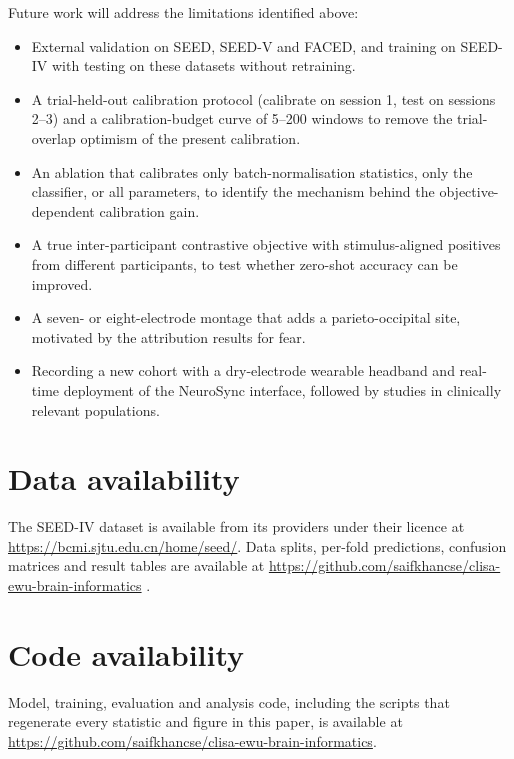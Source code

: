 Future work will address the limitations identified above:

\begin{itemize}
  \item External validation on SEED, SEED-V and FACED, and training on SEED-IV with testing on these datasets without retraining\cite{seed,seedv,faced}.
  \item A trial-held-out calibration protocol (calibrate on session 1, test on sessions 2–3) and a calibration-budget curve of 5–200 windows to remove the trial-overlap optimism of the present calibration.
  \item An ablation that calibrates only batch-normalisation statistics, only the classifier, or all parameters, to identify the mechanism behind the objective-dependent calibration gain.
  \item A true inter-participant contrastive objective with stimulus-aligned positives from different participants, to test whether zero-shot accuracy can be improved.
  \item A seven- or eight-electrode montage that adds a parieto-occipital site, motivated by the attribution results for fear.
  \item Recording a new cohort with a dry-electrode wearable headband and real-time deployment of the NeuroSync interface, followed by studies in clinically relevant populations.
\end{itemize}


\section*{Data availability}
The SEED-IV dataset is available from its providers under their licence at \url{https://bcmi.sjtu.edu.cn/home/seed/}. Data splits, per-fold predictions, confusion matrices and result tables are available at \url{https://github.com/saifkhancse/clisa-ewu-brain-informatics} .

\section*{Code availability}
Model, training, evaluation and analysis code, including the scripts that regenerate every statistic and figure in this paper, is available at \url{https://github.com/saifkhancse/clisa-ewu-brain-informatics}.

